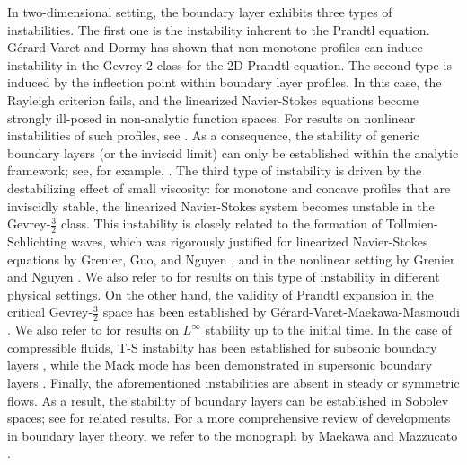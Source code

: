 \documentclass[reqno,11pt]{amsart}
\numberwithin{equation}{section}
\numberwithin{equation}{section}
\theoremstyle{plain}
\begin{document}
In two-dimensional setting, the boundary layer exhibits three types of instabilities. The first one is the instability inherent to the Prandtl equation. G\'erard-Varet and Dormy \cite{GD} has shown that non-monotone profiles can induce instability in the Gevrey-$2$ class for the 2D Prandtl equation. The second type is induced by the inflection point within boundary layer profiles. In this case, the Rayleigh criterion fails, and the linearized Navier-Stokes equations become strongly ill-posed in non-analytic function spaces. For results on nonlinear instabilities of such profiles, see \cite{BG,G2000,GN}. As a consequence, the stability of generic boundary layers (or the inviscid limit) can only be established within the analytic framework; see, for example, \cite{FM-TT-2018,KVW,NN,YM2014,SC2,WC-WY-ZZ,WC-WY-ZZ1}. The third type of instability is driven by the destabilizing effect of small viscosity: for monotone and concave profiles that are inviscidly stable, the linearized Navier-Stokes system becomes unstable in the Gevrey-$\frac32$ class. This instability is closely related to the formation of Tollmien-Schlichting waves, which was rigorously justified for linearized Navier-Stokes equations by Grenier, Guo, and Nguyen  \cite{GGN-DMJ}, and in the nonlinear setting by Grenier and Nguyen \cite{GN1}. We also refer to \cite{BG2} for results on this type of instability in different physical settings. On the other hand, the validity of Prandtl expansion in the critical Gevrey-$\frac32$ space has been established by G\'erard-Varet-Maekawa-Masmoudi \cite{GMM-duke,GMM-arxiv}. We also refer to \cite{CWZ1} for results on $L^\infty$ stability up to the initial time. In the case of compressible fluids, T-S instabilty has been established for subsonic boundary layers \cite{MWWZ-TS-proc,YZ}, while the Mack mode has been demonstrated in supersonic boundary layers \cite{MWWZ-2024supersonic}. Finally, the aforementioned instabilities are absent in steady or symmetric flows. As a result, the stability of boundary layers can be established in Sobolev spaces; see \cite{GM,GI,IM,MT-2010} for related results. For a more comprehensive review of developments in boundary layer theory, we refer to the monograph by Maekawa and Mazzucato \cite{MZ}.
\\
\end{document}
